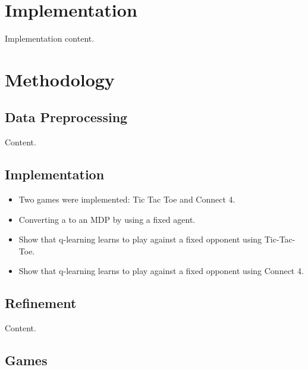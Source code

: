 \documentclass{article}
\begin{document}
\section{Implementation}

Implementation content.

\section{Methodology}

\subsection{Data Preprocessing}

Content.

\subsection{Implementation}

\begin{itemize}

    \item Two games were implemented: Tic Tac Toe and Connect 4.
    \item Converting a to an MDP by using a fixed agent.
    \item Show that q-learning learns to play against a fixed opponent using Tic-Tac-Toe.
    \item Show that q-learning learns to play against a fixed opponent using Connect 4.

\end{itemize}

\subsection{Refinement}

Content.

\subsection{Games}
\end{document}
